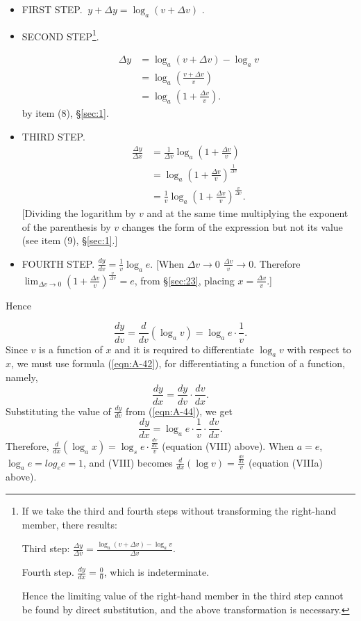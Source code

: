 \begin{itemize}
\item 
FIRST STEP. $	\ y + \Delta y 	= \log_a(v + \Delta v)$ .
\item 
SECOND STEP\footnote{If we take the third and fourth steps 
without transforming the right-hand member, there results:

Third step: $\frac{\Delta y}{\Delta v} = \frac{\log_a(v + \Delta v) - \log_a v}{\Delta v}$.

Fourth step. $\frac{dy}{dx} = \frac{0}{0}$, which is indeterminate. 

Hence the limiting value of the right-hand member in the third step cannot be 
found by direct substitution, and the above transformation is necessary.}.

\[
\begin{array}{ll}
 \Delta y &= \log_a(v + \Delta v) - \log_a v\\
 & = \log_a \left ( \frac{v + \Delta v}{v} \right )\\
& = \log_a \left ( 1 + \frac{\Delta v}{v} \right ).
\end{array}
\]
by item (8), \S \ref{sec:1}.

\item 
THIRD STEP. 
\[
\begin{array}{ll}
\frac{\Delta y}{\Delta x} &= \frac{1}{\Delta v} \log_a \left ( 1 + \frac{\Delta v}{v} \right ) \\
&= \log_a \left ( 1 + \frac{\Delta v}{v} \right )^{\frac{1}{\Delta v}}\\
 & 	= \frac{1}{v} \log_a \left ( 1 + \frac{\Delta v}{v} \right )^{\frac{v}{\Delta v}}.
\end{array}
\]
[Dividing the logarithm by $v$ and at the same time multiplying the exponent of the 
parenthesis by $v$ changes the form of the expression but not its value (see 
item (9), \S \ref{sec:1}.]

\item 
FOURTH STEP. $	\frac{dy}{dv} 	= \frac{1}{v} \log_a e$.
[When $\Delta v \to 0$ $\frac{\Delta v}{v} \to 0$. Therefore 
$\lim_{\Delta v \to 0} \left ( 1 + \frac{\Delta v}{v} \right )^{\frac{v}{\Delta v}} = e$, 
from \S \ref{sec:23}, placing $x = \frac{\Delta v}{v}$.]
\end{itemize}

Hence

\begin{equation}
\frac{dy}{dv} 	= \frac{d}{dv} \left ( \log_a v \right ) = \log_a e \cdot \frac{1}{v}.
\label{eqn:A-44}
\end{equation}
Since $v$ is a function of $x$ and it is required to differentiate $\log_a v$ 
with respect to $x$, we must use formula (\ref{eqn:A-42}),
for differentiating a function of a function, namely,
\[
  	\frac{dy}{dx} 	= \frac{dy}{dv} \cdot \frac{dv}{dx}.
\]
Substituting 
the %
value of $\frac{dy}{dv}$ from (\ref{eqn:A-44}), we get
\[
  	\frac{dy}{dx} 	= \log_a e \cdot \frac{1}{v} \cdot \frac{dv}{dx}.
\]
Therefore, $\frac{d}{dx} (\log_a x) 	= \log_s e \cdot \frac{\frac{dv}{dx}}{v}$
(equation (VIII) above).
When $a = e$,\ $\log_a e = log_e e = 1$, and (VIII) becomes
$\frac{d}{dx} (\log v) 	= \frac{\frac{dv}{dx}}{v}$ (equation (VIIIa) above).

